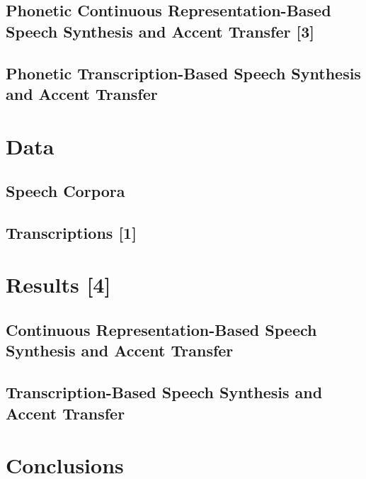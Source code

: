    \subsection{Phonetic Continuous Representation-Based Speech Synthesis and Accent Transfer [3]}
        
    \subsection{Phonetic Transcription-Based Speech Synthesis and Accent Transfer}
        
\section{Data} %
    \subsection{Speech Corpora}
        
    \subsection{Transcriptions [1]}
        
\section{Results [4]} %
    \subsection{Continuous Representation-Based Speech Synthesis and Accent Transfer}
        
    \subsection{Transcription-Based Speech Synthesis and Accent Transfer}
        
\section{Conclusions} %
        


